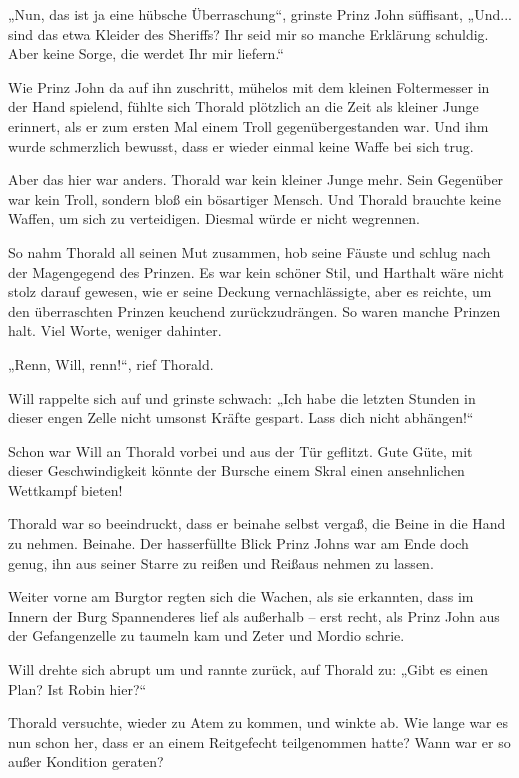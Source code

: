 \documentclass[10pt, a4paper, oneside]{book}
\begin{document}
„Nun, das ist ja eine hübsche Überraschung“, grinste Prinz John süffisant, „Und... sind das etwa Kleider des Sheriffs? Ihr seid mir so manche Erklärung schuldig. Aber keine Sorge, die werdet Ihr mir liefern.“

Wie Prinz John da auf ihn zuschritt, mühelos mit dem kleinen Foltermesser in der Hand spielend, fühlte sich Thorald plötzlich an die Zeit als kleiner Junge erinnert, als er zum ersten Mal einem Troll gegenübergestanden war. Und ihm wurde schmerzlich bewusst, dass er wieder einmal keine Waffe bei sich trug.

Aber das hier war anders. Thorald war kein kleiner Junge mehr. Sein Gegenüber war kein Troll, sondern bloß ein bösartiger Mensch. Und Thorald brauchte keine Waffen, um sich zu verteidigen. Diesmal würde er nicht wegrennen.

So nahm Thorald all seinen Mut zusammen, hob seine Fäuste und schlug nach der Magengegend des Prinzen. Es war kein schöner Stil, und Harthalt wäre nicht stolz darauf gewesen, wie er seine Deckung vernachlässigte, aber es reichte, um den überraschten Prinzen keuchend zurückzudrängen. So waren manche Prinzen halt. Viel Worte, weniger dahinter.

„Renn, Will, renn!“, rief Thorald.

Will rappelte sich auf und grinste schwach: „Ich habe die letzten Stunden in dieser engen Zelle nicht umsonst Kräfte gespart. Lass dich nicht abhängen!“

Schon war Will an Thorald vorbei und aus der Tür geflitzt. Gute Güte, mit dieser Geschwindigkeit könnte der Bursche einem Skral einen ansehnlichen Wettkampf bieten!

Thorald war so beeindruckt, dass er beinahe selbst vergaß, die Beine in die Hand zu nehmen. Beinahe. Der hasserfüllte Blick Prinz Johns war am Ende doch genug, ihn aus seiner Starre zu reißen und Reißaus nehmen zu lassen.

Weiter vorne am Burgtor regten sich die Wachen, als sie erkannten, dass im Innern der Burg Spannenderes lief als außerhalb – erst recht, als Prinz John aus der Gefangenzelle zu taumeln kam und Zeter und Mordio schrie.

Will drehte sich abrupt um und rannte zurück, auf Thorald zu: „Gibt es einen Plan? Ist Robin hier?“

Thorald versuchte, wieder zu Atem zu kommen, und winkte ab. Wie lange war es nun schon her, dass er an einem Reitgefecht teilgenommen hatte? Wann war er so außer Kondition geraten?
\end{document}
